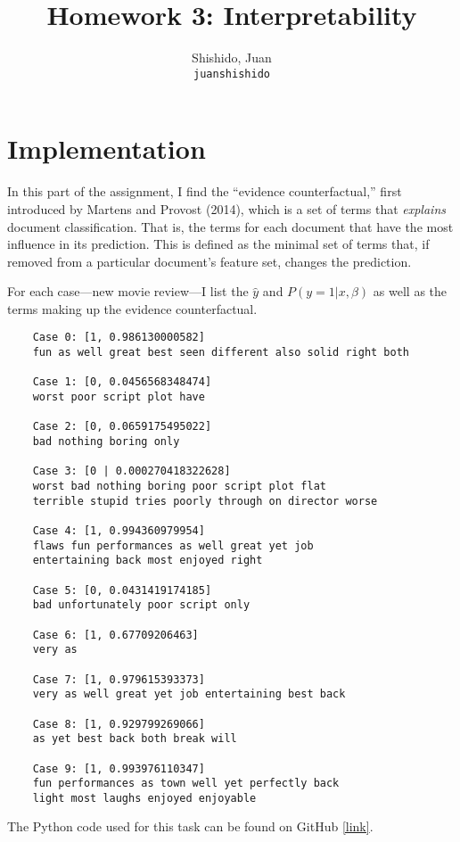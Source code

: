\documentclass[11pt]{article}
\title{Homework 3: Interpretability}
\author{
  Shishido, Juan\\
  \texttt{juanshishido}
}
\begin{document}
\maketitle

\section{Implementation}

In this part of the assignment, I find the ``evidence counterfactual,'' first
introduced by Martens and Provost (2014), which is a set of terms that
\textit{explains} document classification. That is, the terms for each
document that have the most influence in its prediction. This is defined as the 
minimal set of terms that, if removed from a particular document's feature set, 
changes the prediction.

For each case---new movie review---I list the $\hat{y}$ and $P(y = 1 | x,\beta)$
as well as the terms making up the evidence counterfactual.

\begin{lstlisting}
    Case 0: [1, 0.986130000582]
    fun as well great best seen different also solid right both

    Case 1: [0, 0.0456568348474]
    worst poor script plot have

    Case 2: [0, 0.0659175495022]
    bad nothing boring only

    Case 3: [0 | 0.000270418322628]
    worst bad nothing boring poor script plot flat
    terrible stupid tries poorly through on director worse

    Case 4: [1, 0.994360979954]
    flaws fun performances as well great yet job
    entertaining back most enjoyed right

    Case 5: [0, 0.0431419174185]
    bad unfortunately poor script only

    Case 6: [1, 0.67709206463]
    very as

    Case 7: [1, 0.979615393373]
    very as well great yet job entertaining best back

    Case 8: [1, 0.929799269066]
    as yet best back both break will

    Case 9: [1, 0.993976110347]
    fun performances as town well yet perfectly back
    light most laughs enjoyed enjoyable
\end{lstlisting}

The Python code used for this task can be found on GitHub
\href{https://github.com/juanshishido/info290-dds/blob/master/assignments/assignment03/code/sedc.py}{[link]}.
\end{document}
